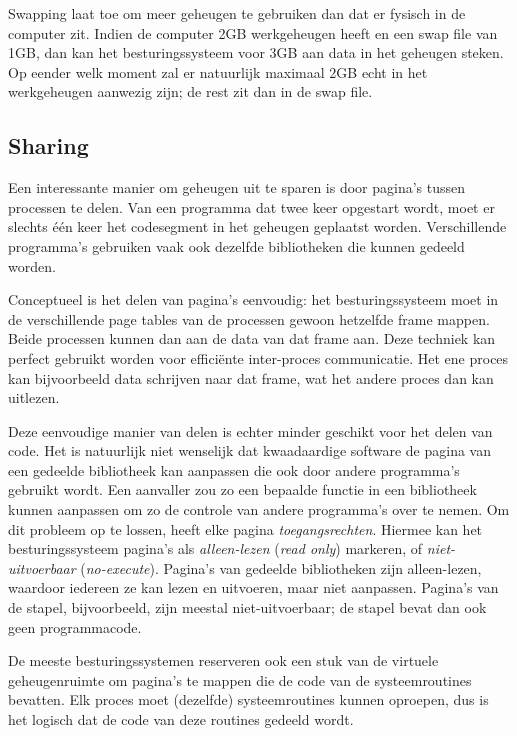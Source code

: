 Swapping laat toe om meer geheugen te gebruiken dan dat er fysisch in de computer zit. Indien de computer 2GB werkgeheugen heeft en een swap file van 1GB, dan kan het besturingssysteem voor 3GB aan data in het geheugen steken. Op eender welk moment zal er natuurlijk maximaal 2GB echt in het werkgeheugen aanwezig zijn; de rest zit dan in de swap file.

\subsection{Sharing}

Een interessante manier om geheugen uit te sparen is door pagina's tussen processen te delen. Van een programma dat twee keer opgestart wordt, moet er slechts \'e\'en keer het codesegment in het geheugen geplaatst worden. Verschillende programma's gebruiken vaak ook dezelfde bibliotheken die kunnen gedeeld worden.

Conceptueel is het delen van pagina's eenvoudig: het besturingssysteem moet in de verschillende page tables van de processen gewoon hetzelfde frame mappen. Beide processen kunnen dan aan de data van dat frame aan. Deze techniek kan perfect gebruikt worden voor effici\"ente inter-proces communicatie. Het ene proces kan bijvoorbeeld data schrijven naar dat frame, wat het andere proces dan kan uitlezen.

Deze eenvoudige manier van delen is echter minder geschikt voor het delen van code. Het is natuurlijk niet wenselijk dat kwaadaardige software de pagina van een gedeelde bibliotheek kan aanpassen die ook door andere programma's gebruikt wordt. Een aanvaller zou zo een bepaalde functie in een bibliotheek kunnen aanpassen om zo de controle van andere programma's over te nemen. Om dit probleem op te lossen, heeft elke pagina \emph{toegangsrechten}. Hiermee kan het besturingssysteem pagina's als \emph{alleen-lezen} (\emph{read only}) markeren, of \emph{niet-uitvoerbaar} (\emph{no-execute}). Pagina's van gedeelde bibliotheken zijn alleen-lezen, waardoor iedereen ze kan lezen en uitvoeren, maar niet aanpassen. Pagina's van de stapel, bijvoorbeeld, zijn meestal niet-uitvoerbaar; de stapel bevat dan ook geen programmacode.

De meeste besturingssystemen reserveren ook een stuk van de virtuele geheugenruimte om pagina's te mappen die de code van de systeemroutines bevatten. Elk proces moet (dezelfde) systeemroutines kunnen oproepen, dus is het logisch dat de code van deze routines gedeeld wordt.

